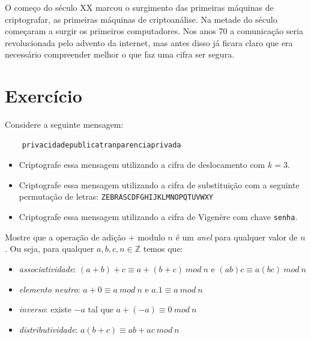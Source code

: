 O começo do século XX marcou o surgimento das primeiras máquinas de criptografar, as primeiras máquinas de criptoanálise. 
Na metade do século começaram a surgir os primeiros computadores.
Nos anos 70 a comunicação seria revolucionada pelo advento da internet, mas antes disso já ficara claro que era necessário compreender melhor o que faz uma cifra ser segura. 

\section{Exercício}
\label{sec:exercicio}

\begin{exercicio}
  Considere a seguinte mensagem:
  \begin{verbatim}
    privacidadepublicatranparenciaprivada
  \end{verbatim}
  \begin{itemize}
  \item Criptografe essa mensagem utilizando a cifra de deslocamento com $k = 3$.
  \item Criptografe essa mensagem utilizando a cifra de substituição com a seguinte permutação de letras: {\tt ZEBRASCDFGHIJKLMNOPQTUVWXY}
  \item Criptografe essa mensagem utilizando a cifra de Vigenère com chave {\tt senha}.
  \end{itemize}
\end{exercicio}


\begin{exercicio}
  Mostre que a operação de adição $+$ modulo $n$ é um {\em anel} para qualquer valor de $n$.
Ou seja, para qualquer $a, b, c, n \in \mathbb{Z}$ temos que:
\begin{itemize}
\item {\em associatividade}: $(a+b)+c \equiv a+(b+c)\ mod\ n$ e $(ab)c \equiv a(bc)\ mod\ n$
\item {\em elemento neutro}: $a + 0 \equiv a\ mod\ n$ e $a.1 \equiv a\ mod\ n$
\item {\em inverso}: existe $-a$ tal que $a + (-a) \equiv 0\ mod\ n$
\item {\em distributividade}: $a(b + c) \equiv ab + ac\ mod\ n$
\end{itemize}
\end{exercicio}

